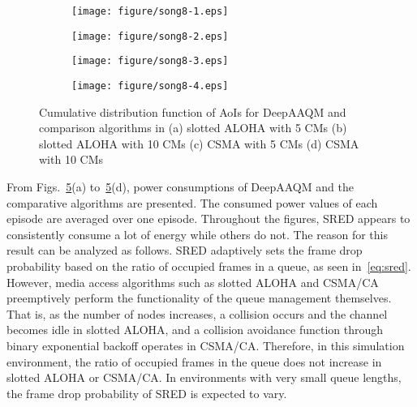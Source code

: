 \documentclass[journal]{IEEEtran}
\begin{document}
\begin{figure}
    \centering
    \begin{subfigure}{0.24\textwidth}
        \centering
        \texttt{[image: figure/song8-1.eps]}
        \caption{}
        \label{fig:power1}
    \end{subfigure}
    \begin{subfigure}{0.24\textwidth}
        \centering
        \texttt{[image: figure/song8-2.eps]}
        \caption{}
        \label{fig:power2}
    \end{subfigure}
    \hfill
    \begin{subfigure}{0.24\textwidth}
        \centering
        \texttt{[image: figure/song8-3.eps]}
        \caption{}
        \label{fig:power3}
    \end{subfigure}
    \begin{subfigure}{0.24\textwidth}
        \centering
        \texttt{[image: figure/song8-4.eps]}
        \caption{}
        \label{fig:power4}
    \end{subfigure}
    \caption{Cumulative distribution function of AoIs for DeepAAQM and comparison algorithms in (a) slotted ALOHA with 5 CMs (b) slotted ALOHA with 10 CMs (c) CSMA with 5 CMs (d) CSMA with 10 CMs }
    \label{fig:power}
\end{figure}

From Figs.~\ref{fig:power}(a) to~\ref{fig:power}(d), power consumptions of DeepAAQM and the comparative algorithms are presented. The consumed power values of each episode are averaged over one episode. Throughout the figures, SRED appears to consistently consume a lot of energy while others do not. The reason for this result can be analyzed as follows. SRED adaptively sets the frame drop probability based on the ratio of occupied frames in a queue, as seen in~\eqref{eq:sred}. However, media access algorithms such as slotted ALOHA and CSMA/CA preemptively perform the functionality of the queue management themselves. That is, as the number of nodes increases, a collision occurs and the channel becomes idle in slotted ALOHA, and a collision avoidance function through binary exponential backoff operates in CSMA/CA. Therefore, in this simulation environment, the ratio of occupied frames in the queue does not increase in slotted ALOHA or CSMA/CA. In environments with very small queue lengths, the frame drop probability of SRED is expected to vary.
\end{document}

